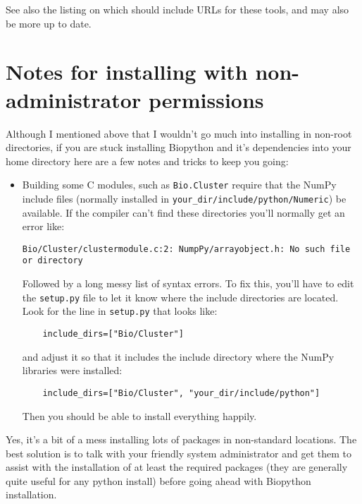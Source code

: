 \documentclass{article}
\begin{document}
\noindent
See also the listing on  which should include URLs for these tools, and may also be more up to date.

\section{Notes for installing with non-administrator permissions}

Although I mentioned above that I wouldn't go much into installing in
non-root directories, if you are stuck installing
Biopython and it's dependencies into your home directory here are a
few notes and tricks to keep you going:

\begin{itemize}

  \item Building some C modules, such as \verb|Bio.Cluster| require that 
    the NumPy include files (normally installed in
    \verb|your_dir/include/python/Numeric|) be available. If the
    compiler can't find these directories you'll normally get an error
    like:

    \begin{verbatim}
Bio/Cluster/clustermodule.c:2: NumpPy/arrayobject.h: No such file or directory
    \end{verbatim}

    Followed by a long messy list of syntax errors. To fix this, you'll
    have to edit the \verb|setup.py| file to let it know where the
    include directories are located. Look for the line in
    \verb|setup.py| that looks like:

    \begin{verbatim}
    include_dirs=["Bio/Cluster"]
    \end{verbatim}

    and adjust it so that it includes the include directory where the
    NumPy libraries were installed:
    
    \begin{verbatim}
    include_dirs=["Bio/Cluster", "your_dir/include/python"]
    \end{verbatim}

    Then you should be able to install everything happily.

\end{itemize}

Yes, it's a bit of a mess installing lots of packages in non-standard
locations. The best solution is to talk with your friendly system
administrator and get them to assist with the installation of at least
the required packages (they are generally quite useful for any python
install) before going ahead with Biopython installation.
\end{document}
